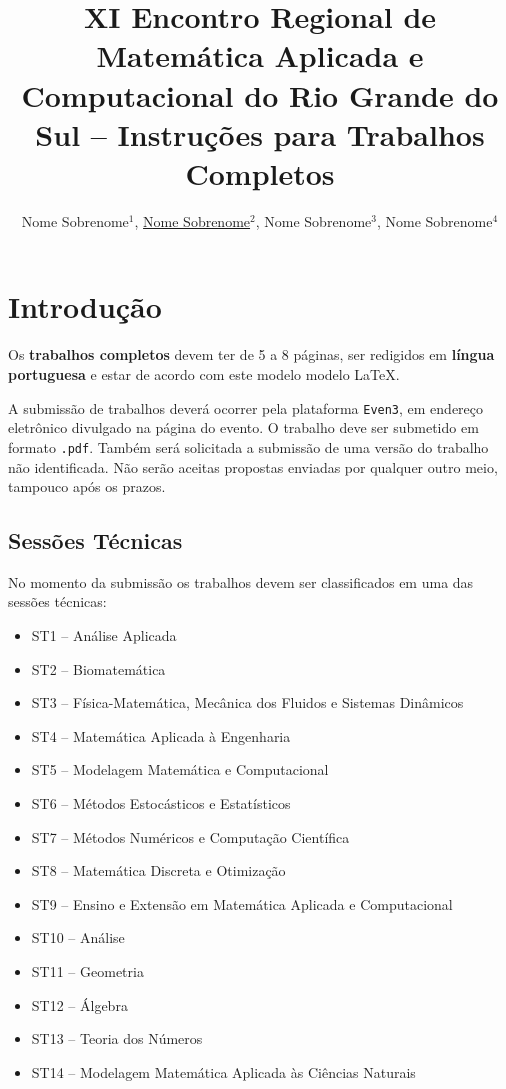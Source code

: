\documentclass{ermacrs2023}
\title{XI Encontro Regional de Matemática Aplicada e Computacional do Rio Grande do Sul -- Instruções para Trabalhos Completos}
\author{Nome Sobrenome$^{1}$, \underline{Nome Sobrenome}$^{2}$, Nome Sobrenome$^{3}$, Nome Sobrenome$^{4}$}
\begin{document}
  \maketitle
  
  \section{Introdução}\label{sec:introducao}
  Os \textbf{trabalhos completos} devem ter de 5 a 8 páginas, ser redigidos em \textbf{língua portuguesa} e estar de acordo com este modelo modelo \LaTeX.
  
  A submissão de trabalhos deverá ocorrer pela plataforma \texttt{Even3}, em endereço eletrônico divulgado na página do evento. O trabalho deve ser submetido em formato \texttt{.pdf}. Também será solicitada a submissão de uma versão do trabalho não identificada. Não serão aceitas propostas enviadas por qualquer outro meio, tampouco após os prazos.

  \subsection{Sessões Técnicas}\label{subsec:sessoes-tecnicas}
  
  No momento da submissão os trabalhos devem ser classificados em uma das sessões técnicas:
  \begin{itemize}
    \item ST1 – Análise Aplicada
    \item ST2 – Biomatemática
    \item ST3 – Física-Matemática, Mecânica dos Fluidos e Sistemas Dinâmicos
    \item ST4 – Matemática Aplicada à Engenharia
    \item ST5 – Modelagem Matemática e Computacional
    \item ST6 – Métodos Estocásticos e Estatísticos
    \item ST7 – Métodos Numéricos e Computação Científica
    \item ST8 – Matemática Discreta e Otimização
    \item ST9 – Ensino e Extensão em Matemática Aplicada e Computacional
    \item ST10 – Análise
    \item ST11 – Geometria
    \item ST12 – Álgebra
    \item ST13 – Teoria dos Números
    \item ST14 – Modelagem Matemática Aplicada às Ciências Naturais
  \end{itemize}
\end{document}
